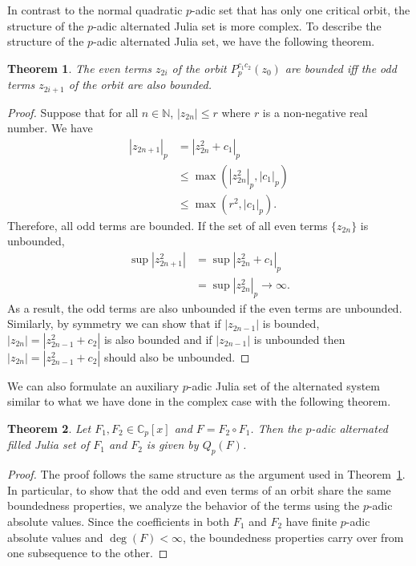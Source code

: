 \documentclass{amsart}
\theoremstyle{plain}
\newtheorem{theorem}{Theorem}[section]
\theoremstyle{definition}
\theoremstyle{remark}
\numberwithin{equation}{section}
\newcommand{\C}{\mathbb{C}}
\newcommand{\N}{\mathbb{N}}
\begin{document}
In contrast to the normal quadratic $p$-adic set that has only one critical orbit, the structure of the $p$-adic alternated Julia set is more complex. To describe the structure of the $p$-adic alternated Julia set, we have the following theorem.
\begin{theorem}
    \label{thm:p-adic boundedness}
    The even terms $z_{2i}$ of the orbit $P^{c_1c_2}_p(z_0)$ are bounded iff the odd terms $z_{2i+1}$ of the orbit are also bounded. 
\end{theorem}
\begin{proof}
    Suppose that for all $n\in\N$, $|z_{2n}|\leq r$ where $r$ is a non-negative real number. We have
    \begin{align*}
        |z_{2n+1}|_p &= |z_{2n}^2 + c_1|_p \\
                & \leq \max(|z_{2n}^2|_p, |c_1|_p) \\
                & \leq \max(r^2, |c_1|_p) \text{.}
    \end{align*}
    Therefore, all odd terms are bounded. If the set of all even terms $\{z_{2n}\}$ is unbounded,
\begin{align*}
    \sup |z_{2n+1}^2| &= \sup |z_{2n}^2 + c_1|_p \\
    &= \sup |z_{2n}^2|_p \to \infty.
\end{align*}
    As a result, the odd terms are also unbounded if the even terms are unbounded. Similarly, by symmetry we can show that if $|z_{2n-1}|$ is bounded, $|z_{2n}| =|z_{2n-1}^2 + c_2|$ is also bounded and if 
    $|z_{2n-1}|$ is unbounded then $|z_{2n}| =|z_{2n-1}^2 + c_2|$ should also be unbounded. 
\end{proof}
We can also formulate an auxiliary $p$-adic Julia set of the alternated system similar to what we have done in the complex case with the following theorem. 
\begin{theorem}
    \label{thm:general}
    Let $F_1, F_2 \in \C_p[x]$ and $F = F_2\circ F_1$. Then the $p$-adic alternated filled Julia set of $F_1$ and $F_2$ is given by $Q_p(F)$.
\end{theorem}
\begin{proof}
    The proof follows the same structure as the argument used in Theorem~\ref{thm:p-adic boundedness}. In particular, to show that the odd and even terms of an orbit share the same boundedness properties, we analyze the behavior of the terms using the $p$-adic absolute values. Since the coefficients in both $F_1$ and $F_2$ have finite $p$-adic absolute values and $\deg(F) < \infty$, the boundedness properties carry over from one subsequence to the other. 
\end{proof}
\end{document}
